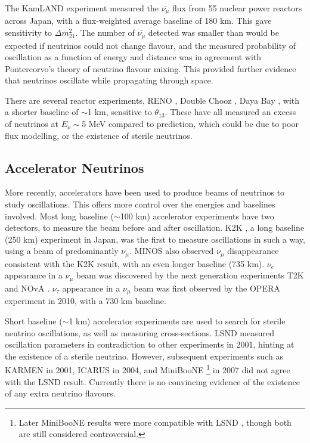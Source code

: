The KamLAND experiment \cite{kamland} measured the $\bar{\nu_{\mu}}$ flux from 55 nuclear power reactors across Japan, with a flux-weighted average baseline of 180 km. This gave sensitivity to $\Delta m_{21}^{2}$. The number of $\bar{\nu_{\mu}}$ detected was smaller than would be expected if neutrinos could not change flavour, and the measured probability of oscillation as a function of energy and distance was in agreement with Pontercorvo's theory of neutrino flavour mixing. This provided further evidence that neutrinos oscillate while propagating through space.

There are several reactor experiments, RENO \cite{reno}, Double Chooz \cite{doublechooz}, Daya Bay \cite{dayabay}, with a shorter baseline of $\sim$1 km, sensitive to $\theta_{13}$. These have all measured an excess of neutrinos at $E_\nu \sim$5 MeV compared to prediction, which could be due to poor flux modelling, or the existence of sterile neutrinos.

\subsection{Accelerator Neutrinos}\label{sec:acceleratorneutrinos}

More recently, accelerators have been used to produce beams of neutrinos to study oscillations. This offers more control over the energies and baselines involved. Most long baseline ($\sim$100 km) accelerator experiments have two detectors, to measure the beam before and after oscillation. K2K \cite{k2k}, a long baseline (250 km) experiment in Japan, was the first to measure oscillations in such a way, using a beam of predominantly $\nu_\mu$. MINOS \cite{minos} also observed $\nu_\mu$ disappearance consistent with the K2K result, with an even longer baseline (735 km). $\nu_e$ appearance in a $\nu_\mu$ beam was discovered by the next generation experiments T2K and NOvA \cite{nova}. $\nu_\tau$ appearance in a $\nu_\mu$ beam was first observed by the OPERA\cite{opera} experiment in 2010, with a 730 km baseline. 

Short baseline ($\sim$1 km) accelerator experiments are used to search for sterile neutrino oscillations, as well as measuring cross-sections. LSND \cite{lsnd} measured oscillation parameters in contradiction to other experiments in 2001, hinting at the existence of a sterile neutrino. However, subsequent experiments such as KARMEN \cite{karmen} in 2001, ICARUS \cite{icarus} in 2004, and MiniBooNE \cite{miniboone1}\footnote{Later MiniBooNE results were more compatible with LSND \cite{miniboone2}, though both are still considered controversial.} in 2007 did not agree with the LSND result. Currently there is no convincing evidence of the existence of any extra neutrino flavours.

